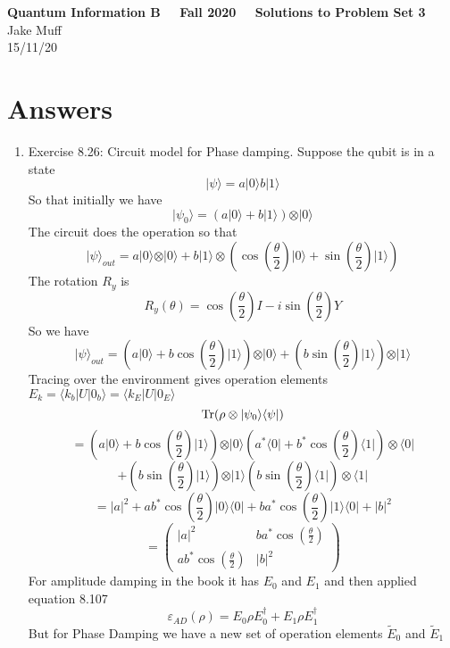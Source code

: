 \documentclass[12pt]{article}
\newcommand{\Tr}{{\rm Tr}}
\newcommand{\ket}[1]{\vert{#1}\rangle}
\newcommand{\bra}[1]{\langle{#1}\vert}
\begin{document}
\normalsize

\baselineskip 14pt

\begin{center}
{\Large {\bf Quantum Information B \ \ Fall 2020 \ \  Solutions to Problem Set 3}} \\
Jake Muff \\
15/11/20
\end{center}

\bigskip
\section{Answers}



\begin{enumerate}
    \item Exercise 8.26: Circuit model for Phase damping. Suppose the qubit is in a state 
    $$ \ket{\psi} = a \ket{0} b \ket{1} $$
    So that initially we have 
    $$ \ket{\psi_0} = (a \ket{0} + b \ket{1} ) \otimes \ket{0} $$
    The circuit does the operation so that 
    $$ \ket{\psi}_{out} = a \ket{0} \otimes \ket{0} + b \ket{1} \otimes ( \cos ( \frac{\theta}{2}) \ket{0} + \sin (\frac{\theta}{2}) \ket{1}) $$
    The rotation $R_y$ is 
    $$ R_y (\theta) = \cos (\frac{\theta}{2})I - i \sin (\frac{\theta}{2}) Y $$
    So we have 
    $$ \ket{\psi}_{out} = (a \ket{0} + b \cos (\frac{\theta}{2} ) \ket{1} ) \otimes \ket{0} + (b \sin (\frac{\theta}{2} ) \ket{1} ) \otimes \ket{1} $$
    Tracing over the environment gives operation elements $E_k = \langle k_b | U | 0_b \rangle = \langle k_E | U | 0_E \rangle $
    $$ \Tr ( \rho \otimes \ket{\psi_0} \bra{\psi} ) $$ 
    $$ = (a \ket{0} + b \cos (\frac{\theta}{2} ) \ket{1} ) \otimes \ket{0} ( a^* \bra{0} + b^* \cos (\frac{\theta}{2}) \bra{1} ) \otimes \bra{0} $$
    $$  + (b \sin (\frac{\theta}{2} ) \ket{1} ) \otimes \ket{1} (b \sin (\frac{\theta}{2}) \bra{1} ) \otimes \bra{1} $$
    $$ = |a|^2 + ab^* \cos (\frac{\theta}{2} ) \ket{0} \bra{0} + ba^* \cos (\frac{\theta}{2}) \ket{1} \bra{0} + |b|^2 $$
    $$ = \left(\begin{array}{cc} |a|^2 & ba^* \cos (\frac{\theta}{2}) \\  ab^* \cos (\frac{\theta}{2}) & |b|^2 \end{array}\right)$$
    For amplitude damping in the book it has $E_0$ and $E_1$ and then applied equation 8.107 
    $$ \varepsilon_{AD} (\rho) = E_0 \rho E_0^{\dagger} + E_1 \rho E_1^{\dagger}$$
    But for Phase Damping we have a new set of operation elements $\tilde{E}_0$ and $\tilde{E}_1$

\end{enumerate}
\end{document}
